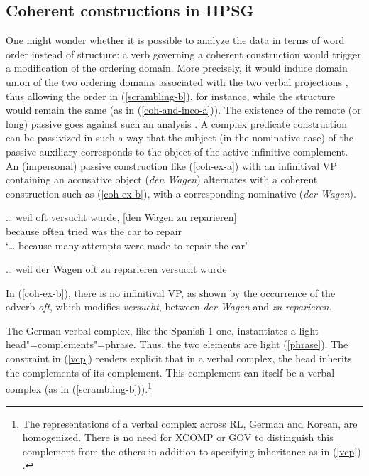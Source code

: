\documentclass[output=paper]{langsci/langscibook}
\begin{document}
	
	\subsection{Coherent constructions in HPSG}
	
	One might wonder whether it is possible to analyze the data in terms of word order instead of structure: a verb governing a coherent construction would trigger a modification of the ordering domain. More precisely, it would induce domain union of the two ordering domains associated with the two verbal projections \citep{Reape94-ohne-crossref}, thus allowing the order in (\ref{scrambling-b}), for instance, while the structure would remain the same (as in (\ref{coh-and-inco-a})). The existence of the remote (or long) passive goes against such an analysis \citep{Kathol98b, Mueller2002b}. A complex predicate construction can be passivized in such a way that the subject (in the nominative case) of the passive auxiliary corresponds to the object of the active infinitive complement. An (impersonal) passive construction like (\ref{coh-ex-a}) with an infinitival VP containing an accusative object (\textit{den Wagen}) alternates with a coherent construction such as (\ref{coh-ex-b}), with a corresponding nominative (\textit{der Wagen}). 
	
	\begin{exe}
		\ex  \label{coh-ex}
		
		\begin{xlist} 
			
			\ex   \label{coh-ex-a}
			\gll \ldots{} weil oft versucht wurde, [den Wagen zu reparieren]\\
            		     {}  because often tried was \spacebr{}the car to repair\\
			\glt `\ldots{} because many attempts were made to repair the car'
			
			\ex   \label{coh-ex-b}
			\ldots{} weil der Wagen oft zu reparieren versucht wurde
		\end{xlist}
		
	\end{exe}
	
	In (\ref{coh-ex-b}), there is no infinitival VP, as shown by the occurrence of the adverb \textit{oft}, which modifies \textit{versucht}, between \textit{der Wagen} and \textit{zu reparieren}.
	
	The German verbal complex, like the Spanish-1 one, instantiates a light head"=complements"=phrase. Thus, the two elements are light (\ref{phrase}). The constraint in (\ref{vcp}) renders explicit that in a verbal complex, the head inherits the complements of its complement. This complement can itself be a verbal complex (as in (\ref{scrambling-b})).\footnote{The representations of a verbal complex across RL, German and Korean, are homogenized. There is no need for XCOMP \citep{Mueller2002b} or GOV \citep{CC1998} to distinguish this complement from the others in addition to specifying inheritance as in (\ref{vcp})  \citep{BW2013}. }
	
\end{document}
